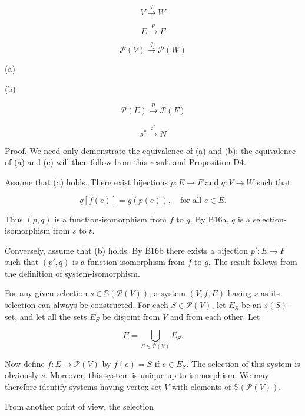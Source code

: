 $$V \xrightarrow{q} W$$

$$E \xrightarrow{p} F$$

$$\mathcal{P}(V) \xrightarrow{q} \mathcal{P}(W)$$

(a)

(b)

$$\mathcal{P}(E) \xrightarrow{p} \mathcal{P}(F)$$

$$s^* \xrightarrow{t^*} N$$

Proof. We need only demonstrate the equivalence of (a) and (b); the equivalence of (a) and (c) will then follow from this result and Proposition D4.

Assume that (a) holds. There exist bijections $p: E \rightarrow F$ and $q: V \rightarrow W$ such that

$$q[f(e)] = g(p(e)), \quad \text{for all } e \in E.$$

Thus $(p, q)$ is a function-isomorphism from $f$ to $g$. By B16a, $q$ is a selection-isomorphism from $s$ to $t$.

Conversely, assume that (b) holds. By B16b there exists a bijection $p': E \rightarrow F$ such that $(p', q)$ is a function-isomorphism from $f$ to $g$. The result follows from the definition of system-isomorphism.

For any given selection $s \in \mathbb{S}(\mathcal{P}(V))$, a system $(V, f, E)$ having $s$ as its selection can always be constructed. For each $S \in \mathcal{P}(V)$, let $E_S$ be an $s(S)$-set, and let all the sets $E_S$ be disjoint from $V$ and from each other. Let

$$E = \bigcup_{S \in \mathcal{P}(V)} E_S.$$

Now define $f: E \rightarrow \mathcal{P}(V)$ by $f(e) = S$ if $e \in E_S$. The selection of this system is obviously $s$. Moreover, this system is unique up to isomorphism. We may therefore identify systems having vertex set $V$ with elements of $\mathbb{S}(\mathcal{P}(V))$.

From another point of view, the selection
